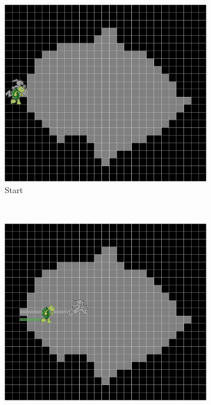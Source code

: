\begin{figure}[H]
  \centering
  \begin{subfigure}[b]{0.32\textwidth}
    \includegraphics[width=\textwidth]{images/surface/tortoise_and_hare_1.png}
    \caption*{Start}
    \label{fig:tortoiseandhare1}
  \end{subfigure}%
  ~ %
  \begin{subfigure}[b]{0.32\textwidth}
    \includegraphics[width=\textwidth]{images/surface/tortoise_and_hare_2.png}

\end{subfigure}
\end{figure}
